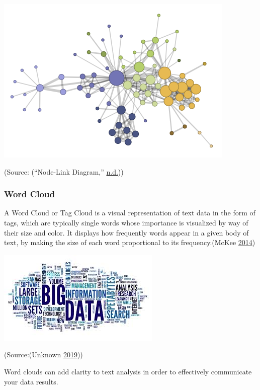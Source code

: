 \documentclass[]{book}
\begin{document}
\includegraphics{images/node-link-diag.png}

(Source: (``Node-Link Diagram,'' \protect\hyperlink{ref-node-link-diag}{n.d.}))

\hypertarget{word-cloud}{%
\subsubsection{Word Cloud}\label{word-cloud}}

A Word Cloud or Tag Cloud is a visual representation of text data in the form of tags, which are typically single words whose importance is visualized by way of their size and color. It displays how frequently words appear in a given body of text, by making the size of each word proportional to its frequency.(McKee \protect\hyperlink{ref-wordcloud}{2014})

\includegraphics{images/WordCloud.jpg}

(Source:(Unknown \protect\hyperlink{ref-wordCloudimage}{2019}))

Word clouds can add clarity to text analysis in order to effectively communicate your data results.
\end{document}
